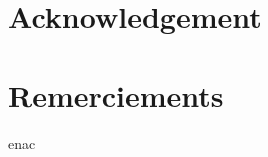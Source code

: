 \ifthenelse{\isundefined{\fr}}
{\chapter*{Acknowledgement}}
{\chapter*{Remerciements}}

\label{remerciements}
\thispagestyle{fancy}
\gls{enac}
\lipsum[1-3]


